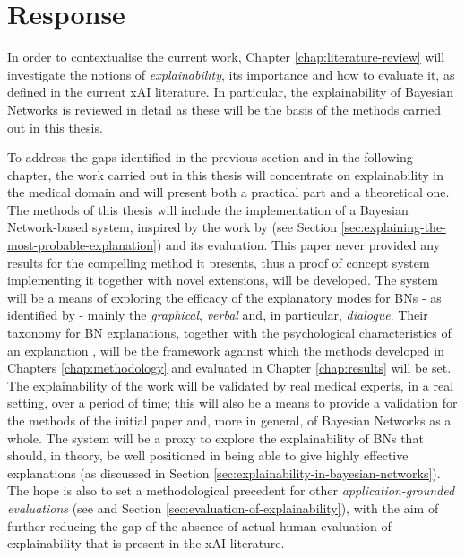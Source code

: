 \section{Response} \label{sec:response}
In order to contextualise the current work, Chapter \ref{chap:literature-review} will investigate the notions of \textit{explainability}, its importance and how to evaluate it, as defined in the current xAI literature.
In particular, the explainability of Bayesian Networks is reviewed in detail as these will be the basis of the methods carried out in this thesis.

To address the gaps identified in the previous section and in the following chapter, the work carried out in this thesis will concentrate on explainability in the medical domain and will present both a practical part and a theoretical one.
The methods of this thesis will include the implementation of a Bayesian Network-based system, inspired by the work by \citet{Butz2018} (see Section \ref{sec:explaining-the-most-probable-explanation}) and its evaluation.
This paper never provided any results for the compelling method it presents, thus a proof of concept system implementing it together with novel extensions, will be developed.
The system will be a means of exploring the efficacy of the explanatory modes for BNs - as identified by \citet{lacave2002review} - mainly the \textit{graphical}, \textit{verbal} and, in particular, \textit{dialogue}.
Their taxonomy for BN explanations, together with the psychological characteristics  of an explanation \citep{miller2018explanation}, will be the framework against which the methods developed in Chapters \ref{chap:methodology} and evaluated in Chapter \ref{chap:results} will be set.
The explainability of the work will be validated by real medical experts, in a real setting, over a period of time; this will also be a means to provide a validation for the methods of the initial paper \citep{Butz2018} and, more in general, of Bayesian Networks as a whole.
The system will be a proxy to explore the explainability of BNs that should, in theory, be well positioned in being able to give highly effective explanations (as discussed in Section \ref{sec:explainability-in-bayesian-networks}).
The hope is also to set a methodological precedent for other \textit{application-grounded evaluations} (see \citep{doshi2017towards} and Section \ref{sec:evaluation-of-explainability}), with the aim of further reducing the gap of the absence of actual human evaluation of explainability that is present in the xAI literature.

